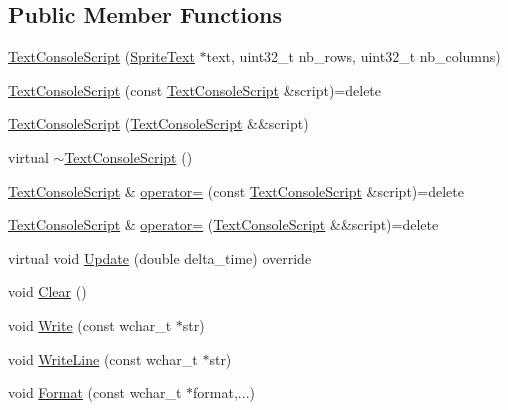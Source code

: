 \subsection*{Public Member Functions}
\begin{DoxyCompactItemize}
\item 
\hyperlink{classmage_1_1_text_console_script_a0a4ee756638b5d1d17ea90b646f056ca}{Text\+Console\+Script} (\hyperlink{classmage_1_1_sprite_text}{Sprite\+Text} $\ast$text, uint32\+\_\+t nb\+\_\+rows, uint32\+\_\+t nb\+\_\+columns)
\item 
\hyperlink{classmage_1_1_text_console_script_ad31e204ced04dc42fb98397df6015198}{Text\+Console\+Script} (const \hyperlink{classmage_1_1_text_console_script}{Text\+Console\+Script} \&script)=delete
\item 
\hyperlink{classmage_1_1_text_console_script_a6d245efb103011f1b2e2c43c590c22bf}{Text\+Console\+Script} (\hyperlink{classmage_1_1_text_console_script}{Text\+Console\+Script} \&\&script)
\item 
virtual \hyperlink{classmage_1_1_text_console_script_a3269d6b792053d4ce13d63103ca5b4e9}{$\sim$\+Text\+Console\+Script} ()
\item 
\hyperlink{classmage_1_1_text_console_script}{Text\+Console\+Script} \& \hyperlink{classmage_1_1_text_console_script_af7da3f0735f72fed0d6fc265b6ae07e9}{operator=} (const \hyperlink{classmage_1_1_text_console_script}{Text\+Console\+Script} \&script)=delete
\item 
\hyperlink{classmage_1_1_text_console_script}{Text\+Console\+Script} \& \hyperlink{classmage_1_1_text_console_script_a2a14c6a981fe7ded4e7a4fa5480ac6cb}{operator=} (\hyperlink{classmage_1_1_text_console_script}{Text\+Console\+Script} \&\&script)=delete
\item 
virtual void \hyperlink{classmage_1_1_text_console_script_a7b1acbf48376b650c08fa941a63ffa98}{Update} (double delta\+\_\+time) override
\item 
void \hyperlink{classmage_1_1_text_console_script_aff5acec462f505735720a17d541ba912}{Clear} ()
\item 
void \hyperlink{classmage_1_1_text_console_script_a659586a498f8ff0f55aa2a3f25f0828b}{Write} (const wchar\+\_\+t $\ast$str)
\item 
void \hyperlink{classmage_1_1_text_console_script_a24fe33795c69e70d07a680826cfafcc1}{Write\+Line} (const wchar\+\_\+t $\ast$str)
\item 
void \hyperlink{classmage_1_1_text_console_script_a4d9ba97e4ff4ad5390b20e5523a20e92}{Format} (const wchar\+\_\+t $\ast$format,...)
\end{DoxyCompactItemize}
